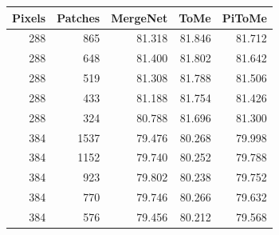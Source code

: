 \begin{tabular}{rrrrr}
\toprule
Pixels & Patches & MergeNet & ToMe & PiToMe \\
\midrule
288 & 865 & 81.318 & 81.846 & 81.712 \\
288 & 648 & 81.400 & 81.802 & 81.642 \\
288 & 519 & 81.308 & 81.788 & 81.506 \\
288 & 433 & 81.188 & 81.754 & 81.426 \\
288 & 324 & 80.788 & 81.696 & 81.300 \\
384 & 1537 & 79.476 & 80.268 & 79.998 \\
384 & 1152 & 79.740 & 80.252 & 79.788 \\
384 & 923 & 79.802 & 80.238 & 79.752 \\
384 & 770 & 79.746 & 80.266 & 79.632 \\
384 & 576 & 79.456 & 80.212 & 79.568 \\
\bottomrule
\end{tabular}

